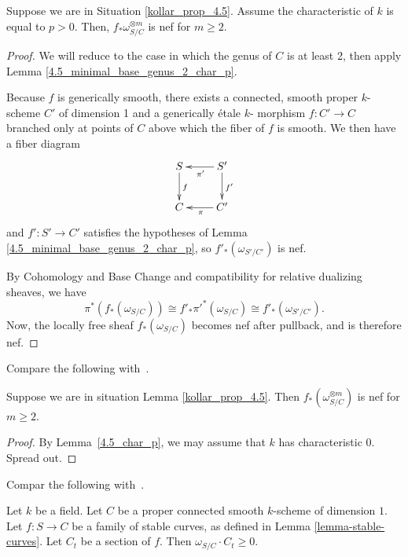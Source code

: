 \begin{lemma}\label{4.5_char_p}
Suppose we are in Situation \ref{kollar_prop_4.5}.
Assume the characteristic of $k$ is equal to $p>0$.
Then, $f_*\omega_{S/C}^{\otimes m}$ is nef for $m \geq 2$.
\end{lemma}

\begin{proof}
We will reduce to the case in which the genus of $C$ is at least 2, then apply
Lemma \ref{4.5_minimal_base_genus_2_char_p}.

Because $f$ is generically smooth, there exists a connected, smooth proper $k$-scheme $C'$ of dimension 1 and a generically \'{e}tale $k$- morphism $f:C'\to C$ branched only at points of $C$ above which the fiber of $f$ is smooth. We then have a fiber diagram
$$
\xymatrix{
S \ar[d]^f  &S' \ar[d]^{f'} \ar[l]^{\pi'} \\
C   &C' \ar[l]^{\pi}
}
$$
and $f':S'\to C'$ satisfies the hypotheses of Lemma \ref{4.5_minimal_base_genus_2_char_p}, so $f'_*(\omega_{S'/C'})$ is nef.

By Cohomology and Base Change and compatibility for relative dualizing sheaves, we have
$$
\pi^*(f_*(\omega_{S/C}))\cong f'_*\pi'^*(\omega_{S/C})\cong f'_*(\omega_{S'/C'}).
$$
Now, the locally free sheaf $f_{*}(\omega_{S/C})$ becomes nef after pullback, and is therefore nef.
\end{proof}



Compare the following with~\cite[Theorem 4.3]{ko90}.

\begin{lemma}
\label{lemma-stable-curves-nef}
Suppose we are in situation Lemma \ref{kollar_prop_4.5}.
Then $f_*(\omega_{S/C}^{\otimes m})$ is nef for $m \geq 2$.
\end{lemma}

\begin{proof}
By Lemma~\ref{4.5_char_p}, we may assume that $k$ has characteristic 0.
Spread out. 
\end{proof}

Compar the following with~\cite[Theorem 4.6]{ko90}.

\begin{lemma}
\label{lemma-stable-curves-nef}
Let $k$ be a field.
Let $C$ be a proper connected smooth $k$-scheme of dimension $1$.
Let $f : S \to C$ be a family of stable curves,
as defined in Lemma \ref{lemma-stable-curves}.
Let $C_t$ be a section of $f$.
Then $\omega_{S/C}\cdot C_t\geq 0$.
\end{lemma}


